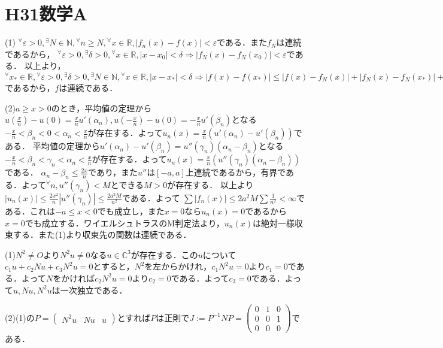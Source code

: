 \documentclass[
		book,
		head_space=20mm,
		foot_space=20mm,
		gutter=10mm,
		line_length=190mm
]{jlreq}
\begin{document}
\section{H31数学A}
(1)
$^{\forall} \varepsilon >0, {}^{\exists} N \in \mathbb{N}, {}^{\forall} n\ge N, {}^{\forall} x \in \mathbb{R}, |f_n(x)-f(x)|<\varepsilon$である．また$f_N$は連続であるから，
$^{\forall} \varepsilon >0, {}^{\exists} \delta >0, {}^{\forall} x \in \mathbb{R}, |x-x_0|<\delta \Rightarrow |f_N(x)-f_N(x_0)|<\varepsilon$である．
以上より，$^{\forall} x_* \in \mathbb{R}, {}^{\forall} \varepsilon >0, {}^{\exists} \delta >0, {}^{\exists} N \in \mathbb{N}, {}^{\forall} x \in \mathbb{R}, |x-x_*|<\delta \Rightarrow |f(x)-f(x_*)|\le |f(x)-f_N(x)|+|f_N(x)-f_N(x_*)|+|f_N(x_*)-f(x_*)|<3\varepsilon$であるから，$f$は連続である．

(2)$a\ge x>0$のとき，平均値の定理から$u\left( \frac{x}{n} \right)-u(0)=\frac{x}{n}u'(\alpha_n), u(-\frac{x}{n})-u(0)=-\frac{x}{n}u'(\beta_n)$となる$-\frac{x}{n}<\beta_n<0<\alpha_n<\frac{x}{n}$が存在する．よって$u_n(x)=\frac{x}{n}(u'(\alpha_n)-u'(\beta_n))$である．
平均値の定理から$u'(\alpha_n)-u'(\beta_n)=u''(\gamma_n)(\alpha_n-\beta_n)$となる$-\frac{x}{n}<\beta_n<\gamma_n<\alpha_n<\frac{x}{n}$が存在する．よって$u_n(x)=\frac{x}{n}(u''(\gamma_n)(\alpha_n-\beta_n))$である．
$\alpha_n-\beta_n\le \frac{2x}{n}$であり，また$u''$は$[-a,a]$上連続であるから，有界である．よって$^\forall n,u''(\gamma_n)<M$とできる$M>0$が存在する．
以上より$|u_n(x)|\le \frac{2x^2}{n}|u''(\gamma_n)|\le \frac{2a^2M}{n^2}$である．よって
$\sum |f_n(x)|\le 2a^2M\sum \frac{1}{n^2}<\infty$である．これは$-a\le x<0$でも成立し，また$x=0$なら$u_n(x)=0$であるから$x=0$でも成立する．ワイエルシュトラスのM判定法より，$u_n(x)$は絶対一様収束する．また(1)より収束先の関数は連続である．

(1)$N^2\neq O$より$N^2u\neq0$なる$u \in \mathbb{C}^3$が存在する．この$u$について$c_1u+c_2Nu+c_3N^2u=0$とすると，$N^2$を左からかけれ，$c_1N^2u=0$より$c_1=0$である．よって$N$をかければ$c_2N^2u=0$より$c_2=0$である．よって$c_3=0$である．よって$u,Nu,N^2u$は一次独立である．

(2)(1)の$P=\begin{pmatrix}
N^2u & Nu & u
\end{pmatrix}$とすれば$P$は正則で$J:=P^{-1}NP=\begin{pmatrix}
0 & 1 & 0\\
0 & 0 & 1\\
0 & 0 & 0
\end{pmatrix}$である．
\end{document}
